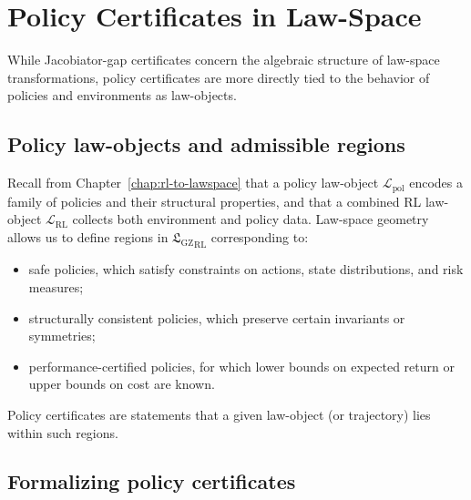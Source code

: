 \documentclass[11pt]{book}
\newcommand{\GZLS}{\ensuremath{\mathfrak{L}_{\mathrm{GZ}}}}
\theoremstyle{plain}
\theoremstyle{definition}
\theoremstyle{remark}
\begin{document}
\section{Policy Certificates in Law-Space}
\label{sec:policy-certificates-lawspace}


While Jacobiator-gap certificates concern the algebraic structure
of law-space transformations, policy certificates are more directly
tied to the behavior of policies and environments as law-objects.

\subsection*{Policy law-objects and admissible regions}

Recall from Chapter~\ref{chap:rl-to-lawspace} that a policy law-object
$\mathcal{L}_{\mathrm{pol}}$ encodes a family of policies and their
structural properties, and that a combined RL law-object
$\mathcal{L}_{\mathrm{RL}}$ collects both environment and policy
data. Law-space geometry allows us to define regions in
${\GZLS}_{\mathrm{RL}}$ corresponding to:
\begin{itemize}
  \item safe policies, which satisfy constraints on actions,
        state distributions, and risk measures;
  \item structurally consistent policies, which preserve certain
        invariants or symmetries;
  \item performance-certified policies, for which lower bounds on
        expected return or upper bounds on cost are known.
\end{itemize}

Policy certificates are statements that a given law-object (or
trajectory) lies within such regions.

\subsection*{Formalizing policy certificates}
\end{document}
